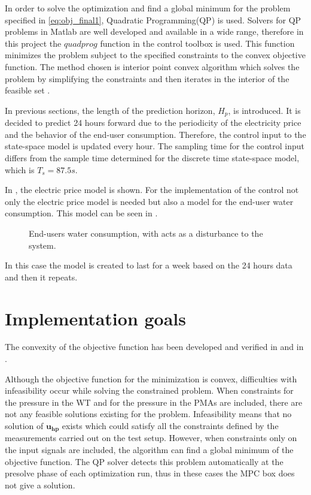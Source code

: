 In order to solve the optimization and find a global minimum for the problem specified in \eqref{eq:obj_final1},  Quadratic Programming(QP) is used. Solvers for QP problems in Matlab are well developed and available in a wide range, therefore in this project the $quadprog$ function in the control toolbox is used. This function minimizes the problem subject to the specified constraints to the convex objective function. The method chosen is interior point convex algorithm which solves the problem by simplifying the constraints and then iterates in the interior of the feasible set \cite{Convex_optimization}. 

In previous sections, the length of the prediction horizon, $H_p$, is introduced. It is decided to predict 24 hours forward due to the periodicity of the electricity price and the behavior of the end-user consumption. Therefore, the control input to the state-space model is updated every hour. The sampling time for the control input differs from the sample time determined for the discrete time state-space model, which is $T_s = 87.5s$. 

In , the electric price model is shown. For the implementation of the control not only the electric price model is needed but also a model for the end-user water consumption. This model can be seen in .

\begin{figure}[H]
\centering
 
\caption{End-users water consumption, with acts as a disturbance to the system.}
\label{fig:water_consumption}
\end{figure}

In this case the model is created to last for a week based on the 24 hours data and then it repeats. 


\section{Implementation goals}
The convexity of the objective function has been developed and verified in  and in . 


Although the objective function for the minimization is convex, difficulties with infeasibility occur while solving the constrained problem. When constraints for the pressure in the WT and for the pressure in the PMAs are included, there are not any feasible solutions existing for the problem. Infeasibility means that no solution of $\bm{u_{hp}}$ exists which could satisfy all the constraints defined by the measurements carried out on the test setup. However, when constraints only on the input signals are included, the algorithm can find a global minimum of the objective function. The QP solver detects this problem automatically at the presolve phase of each optimization run, thus in these cases the MPC box does not give a solution. 

